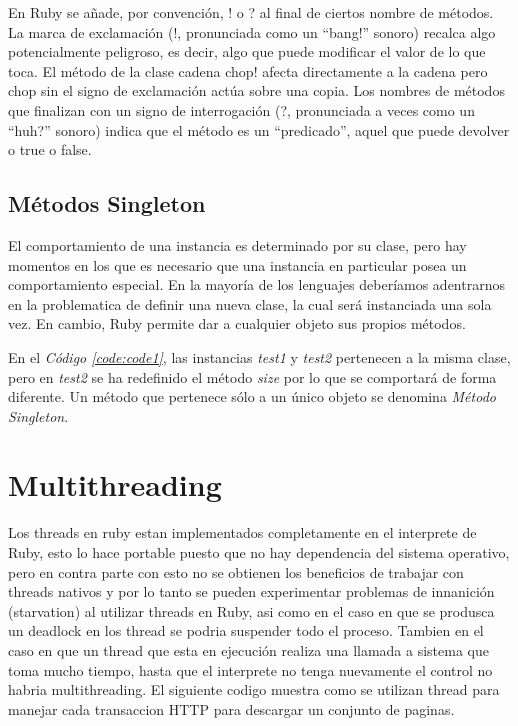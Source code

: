 \documentclass{article}
\newcommand{\refcode}[1]{\textit{Código \ref{#1}}}
\begin{document}
En Ruby se añade, por convención, ! o ? al final de ciertos nombre de métodos.  La marca de exclamación (!, pronunciada como un “bang!” sonoro)  recalca algo potencialmente peligroso, es decir, algo que puede modificar el valor de lo que toca. El método de la clase cadena chop! afecta directamente a la cadena pero chop sin el signo de exclamación actúa sobre una copia.
Los nombres de métodos que finalizan con un signo de interrogación (?, pronunciada a veces como un “huh?” sonoro) indica que el método es un “predicado”, aquel que puede devolver o true o false.


\subsection{Métodos Singleton}

	El comportamiento de una instancia es determinado por su clase, pero hay momentos en los que es necesario que una instancia en particular posea un comportamiento especial. En la mayoría de los lenguajes deberíamos adentrarnos en la problematica de definir una nueva clase, la cual será instanciada una sola vez. En cambio, Ruby permite dar a cualquier objeto sus propios métodos.

 
\bigskip

	En el \refcode{code:code1}, las instancias \textit{test1} y \textit{test2} pertenecen a la misma clase, pero en \textit{test2} se ha redefinido el método \textit{size} por lo que se comportará de forma diferente. Un método que pertenece sólo a un único objeto se denomina \textit{Método Singleton}.

\section{Multithreading}

Los threads en ruby estan implementados completamente en el interprete de Ruby, esto lo hace portable puesto que no hay dependencia del sistema operativo, pero en contra parte con esto no se obtienen los beneficios de trabajar con threads nativos y por lo tanto se pueden experimentar problemas de innanición (starvation) al utilizar threads en Ruby, asi como en el caso en que se produsca un deadlock en los thread se podria suspender todo el proceso. Tambien en el caso en que un thread que esta en ejecución realiza una llamada a sistema que toma mucho tiempo, hasta que el interprete no tenga nuevamente el control no habria multithreading.
El siguiente codigo muestra como se utilizan thread para manejar cada transaccion HTTP para descargar un conjunto de paginas.
\end{document}
